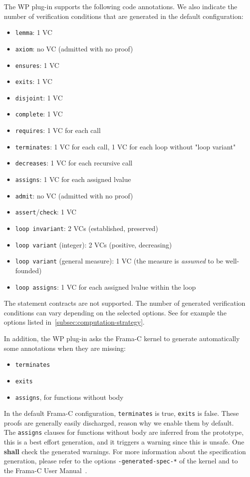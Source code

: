 The \textsf{WP} plug-in supports the following code annotations. We also
indicate the number of verification conditions that are generated in the
default configuration:
\begin{itemize}
  \item \lstinline{lemma}: 1 VC
  \item \lstinline{axiom}: no VC (admitted with no proof)
  \item \lstinline{ensures}: 1 VC
  \item \lstinline{exits}: 1 VC
  \item \lstinline{disjoint}: 1 VC
  \item \lstinline{complete}: 1 VC
  \item \lstinline{requires}: 1 VC for each call
  \item \lstinline{terminates}: 1 VC for each call, 1 VC for each loop without "loop variant"
  \item \lstinline{decreases}: 1 VC for each recursive call
  \item \lstinline{assigns}: 1 VC for each assigned lvalue
  \item \lstinline{admit}: no VC (admitted with no proof)
  \item \lstinline{assert}/\lstinline{check}: 1 VC
  \item \lstinline{loop invariant}: 2 VCs (established, preserved)
  \item \lstinline{loop variant} (integer): 2 VCs (positive, decreasing)
  \item \lstinline{loop variant} (general measure): 1 VC (the measure is \emph{assumed} to be well-founded)
  \item \lstinline{loop assigns}: 1 VC for each assigned lvalue within the loop
\end{itemize}
The statement contracts are not supported. The number of generated verification
conditions can vary depending on the selected options. See for example the
options listed in~\ref{subsec:computation-strategy}.

In addition, the \textsf{WP} plug-in asks the \textsf{Frama-C} kernel to generate
automatically some annotations when they are missing:
\begin{itemize}
  \item \lstinline{terminates}
  \item \lstinline{exits}
  \item \lstinline{assigns}, for functions without body
\end{itemize}
In the default \textsf{Frama-C} configuration, \lstinline{terminates} is true,
\lstinline{exits} is false. These proofs are generally easily discharged, reason
why we enable them by default. The \lstinline{assigns} clauses for functions
without body are inferred from the prototype, this is a best effort generation,
and it triggers a warning since this is unsafe. One \textbf{shall} check the
generated warnings. For more information about the specification generation,
please refer to the options \lstinline{-generated-spec-*} of the kernel and to
the \textsf{Frama-C} User Manual~\cite{userman}.


